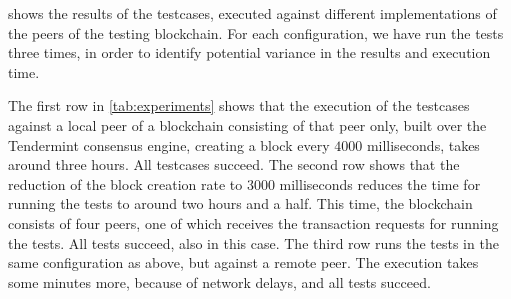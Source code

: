  shows the results of the testcases, executed against
different implementations of the peers of the testing blockchain.
For each configuration, we have run the tests three times, in order to
identify potential variance in the results and execution time.

The first row in \cref{tab:experiments} shows
that the execution of the testcases against a local peer of a blockchain consisting of
that peer only, built over the Tendermint consensus engine, creating a block every $4000$
milliseconds, takes around three hours. All testcases succeed. The second row shows
that the reduction of the block creation rate to $3000$ milliseconds reduces the time for
running the tests to around two hours and a half. This time, the blockchain consists of
four peers, one of which receives the transaction requests for running the tests.
All tests succeed, also in this case. The third row runs the tests in the same
configuration as above, but against a remote peer.
The execution takes some minutes more, because of network delays, and all tests succeed.

